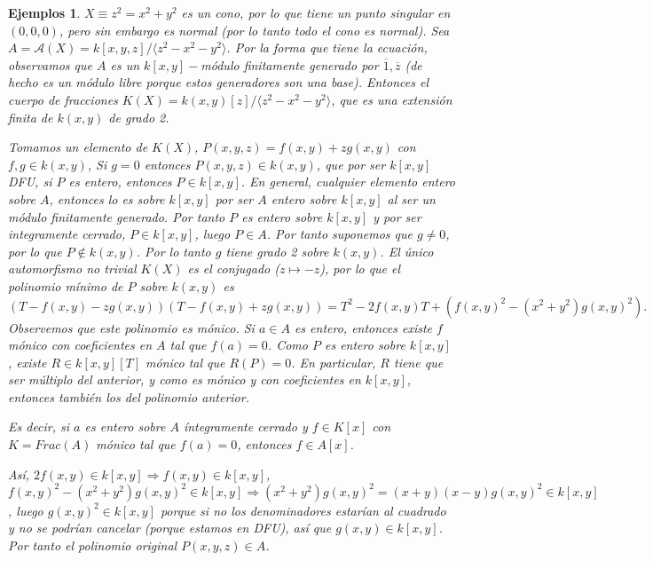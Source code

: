 \documentclass[a4paper,10pt]{book}
\newtheorem{eje}[thm]{Ejemplos}
\begin{document}
\begin{eje}
$X\equiv z^2=x^2+y^2$ es un cono, por lo que tiene un punto singular en $(0,0,0)$, pero sin embargo es normal (por lo tanto todo el cono es normal). Sea $A=\mathcal{A}(X)=k[x,y,z]/\langle z^2-x^2-y^2\rangle$. Por la forma que tiene la ecuación, observamos que $A$ es un $k[x,y]-$módulo finitamente generado por $\overline{1},\overline{z}$ (de hecho es un módulo libre porque estos generadores son una base). Entonces el cuerpo de fracciones $K(X)=k(x,y)[z]/\langle z^2-x^2-y^2\rangle$, que es una extensión finita de $k(x,y)$ de grado 2.  

Tomamos un elemento de $K(X)$, $P(x,y,z)=f(x,y)+zg(x,y)$ con $f,g\in k(x,y)$, Si $g=0$ entonces $P(x,y,z)\in k(x,y)$, que por ser $k[x,y]$ DFU, si $P$ es entero, entonces $P\in k[x,y]$.  En general, cualquier elemento entero sobre $A$, entonces lo es sobre $k[x,y]$ por ser $A$ entero sobre $k[x,y]$ al ser un módulo finitamente generado. Por tanto $P$ es entero sobre $k[x,y]$ y por ser integramente cerrado, $P\in k[x,y]$, luego $P\in A$. Por tanto suponemos que $g\neq 0$, por lo que $P\notin k(x,y)$. Por lo tanto $g$ tiene grado 2 sobre $k(x,y)$. El único automorfismo no trivial $K(X)$ es el conjugado ($z\mapsto -z$), por lo que el polinomio mínimo de $P$ sobre $k(x,y)$ es
$$(T-f(x,y)-zg(x,y))(T-f(x,y)+zg(x,y))=T^2-2f(x,y)T+(f(x,y)^2-(x^2+y^2)g(x,y)^2).$$
Observemos que este polinomio es mónico. Si $a\in A$ es entero, entonces existe $f$ mónico con coeficientes en $A$ tal que $f(a)=0$. Como $P$ es entero sobre $k[x,y]$, existe $R\in k[x,y][T]$ mónico tal que $R(P)=0$. En particular, $R$ tiene que ser múltiplo del anterior, y como es mónico y con coeficientes en $k[x,y]$, entonces también los del polinomio anterior.

Es decir, si $a$ es entero sobre $A$ íntegramente cerrado y $f\in K[x]$ con $K=Frac(A)$ mónico tal que $f(a)=0$, entonces $f\in A[x]$. 

Así, $2f(x,y)\in k[x,y]\Rightarrow f(x,y)\in k[x,y]$, $f(x,y)^2-(x^2+y^2)g(x,y)^2\in k[x,y]\Rightarrow (x^2+y^2)g(x,y)^2=(x+y)(x-y)g(x,y)^2\in k[x,y]$, luego $g(x,y)^2\in k[x,y]$ porque si no los denominadores estarían al cuadrado y no se podrían cancelar (porque estamos en DFU), así que $g(x,y)\in k[x,y]$. Por tanto el polinomio original $P(x,y,z)\in A$. 
\end{eje}
\end{document}
